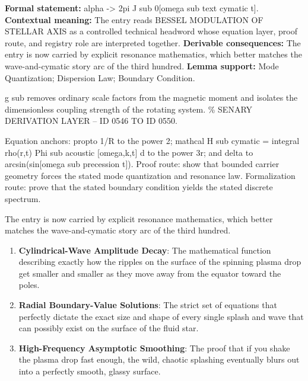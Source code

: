 \begingroup\footnotesize\setlength{\emergencystretch}{3em}\sloppy
\textbf{Formal statement:} alpha -> 2pi J sub 0[omega sub text cymatic t]. \textbf{Contextual meaning:} The entry reads BESSEL MODULATION OF STELLAR AXIS as a controlled technical headword whose equation layer, proof route, and registry role are interpreted together. \textbf{Derivable consequences:} The entry is now carried by explicit resonance mathematics, which better matches the wave-and-cymatic story arc of the third hundred. \textbf{Lemma support:} Mode Quantization; Dispersion Law; Boundary Condition.\par
\endgroup

g sub removes ordinary scale factors from the magnetic moment and isolates the dimensionless coupling strength of the rotating system. \% SENARY DERIVATION LAYER -- ID 0546 TO ID 0550.

Equation anchors: propto 1/R to the power 2; mathcal H sub cymatic = integral rho(r,t) Phi sub acoustic [omega,k,t] d to the power 3r; and delta to arcsin(sin[omega sub precession t]). Proof route: show that bounded carrier geometry forces the stated mode quantization and resonance law. Formalization route: prove that the stated boundary condition yields the stated discrete spectrum.

The entry is now carried by explicit resonance mathematics, which better matches the wave-and-cymatic story arc of the third hundred.
\endgroup

\begin{enumerate}[leftmargin=1.6em,itemsep=6pt,topsep=4pt]
\item \textbf{Cylindrical-Wave Amplitude Decay}: The mathematical function describing exactly how the ripples on the surface of the spinning plasma drop get smaller and smaller as they move away from the equator toward the poles.
\item \textbf{Radial Boundary-Value Solutions}: The strict set of equations that perfectly dictate the exact size and shape of every single splash and wave that can possibly exist on the surface of the fluid star.
\item \textbf{High-Frequency Asymptotic Smoothing}: The proof that if you shake the plasma drop fast enough, the wild, chaotic splashing eventually blurs out into a perfectly smooth, glassy surface.
\end{enumerate}

